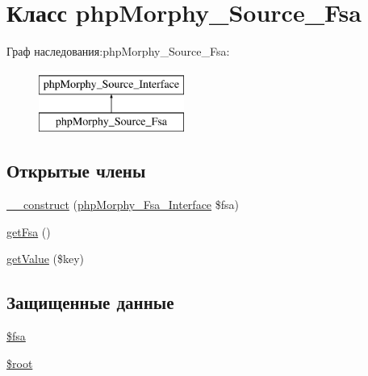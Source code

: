 \hypertarget{classphpMorphy__Source__Fsa}{
\section{Класс phpMorphy\_\-Source\_\-Fsa}
\label{classphpMorphy__Source__Fsa}
}
Граф наследования:phpMorphy\_\-Source\_\-Fsa:\begin{figure}[H]
\begin{center}
\leavevmode
\includegraphics[height=2.000000cm]{classphpMorphy__Source__Fsa}
\end{center}
\end{figure}
\subsection*{Открытые члены}
\begin{DoxyCompactItemize}
\item 
\hyperlink{classphpMorphy__Source__Fsa_a13e53f859f280e977107f0d0d8fc99d4}{\_\-\_\-construct} (\hyperlink{interfacephpMorphy__Fsa__Interface}{phpMorphy\_\-Fsa\_\-Interface} \$fsa)
\item 
\hyperlink{classphpMorphy__Source__Fsa_a885f99d96551ffe6ef4ffab6e9390e27}{getFsa} ()
\item 
\hyperlink{classphpMorphy__Source__Fsa_a58582f9663457bd6ff97b575c38dcc65}{getValue} (\$key)
\end{DoxyCompactItemize}
\subsection*{Защищенные данные}
\begin{DoxyCompactItemize}
\item 
\hyperlink{classphpMorphy__Source__Fsa_a7efd6754366f9c272fa229091a4633df}{\$fsa}
\item 
\hyperlink{classphpMorphy__Source__Fsa_ac6e34710b17c0a2f69f2f161f218eef1}{\$root}
\end{DoxyCompactItemize}


